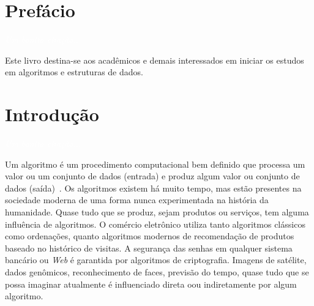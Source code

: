 \documentclass[11pt,fleqn]{book} %
\begin{document}
\renewcommand\contentsname{Sumário}
\tableofcontents

\chapter{Prefácio}\label{prefacio}
\vspace{6em}
\begin{flushright}
	\textit{\textcolor{white}{Um bonita citação...}}
\end{flushright}
\vspace{12em}


Este livro destina-se aos acadêmicos e demais interessados em iniciar os estudos em algoritmos e estruturas de dados.

\chapter{Introdução}\label{introducao}
\vspace{6em}
\begin{flushright}
	\textit{\textcolor{white}{Um bonita citação...}}
\end{flushright}
\vspace{12em}


Um algoritmo é um procedimento computacional bem definido que processa um valor ou um conjunto de dados (entrada) e produz algum valor ou conjunto de dados (saída)~\cite{cormen2009}.
Os algoritmos existem há muito tempo, mas estão presentes na sociedade moderna de uma forma nunca experimentada na história da humanidade.
Quase tudo que se produz, sejam produtos ou serviços, tem alguma influência de algoritmos.
O comércio eletrônico utiliza tanto algoritmos clássicos como ordenações, quanto algoritmos modernos de recomendação de produtos baseado no histórico de visitas.
A segurança das senhas em qualquer sistema bancário ou \textit{Web} é garantida por algoritmos de criptografia.
Imagens de satélite, dados genômicos, reconhecimento de faces, previsão do tempo, quase tudo que se possa imaginar atualmente é influenciado direta oou indiretamente por algum algoritmo.
\end{document}
